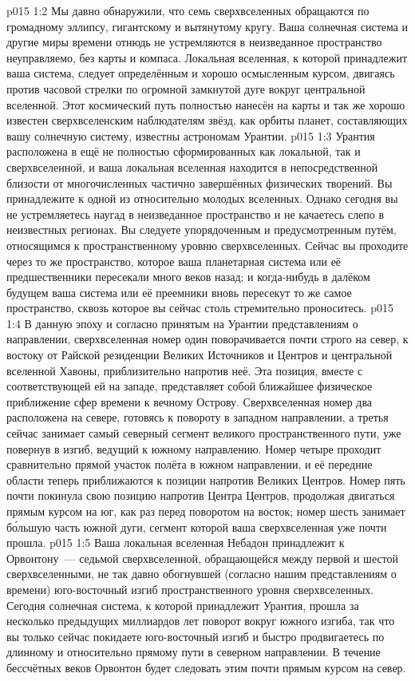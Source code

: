 \vs p015 1:2 Мы давно обнаружили, что семь сверхвселенных обращаются по громадному эллипсу, гигантскому и вытянутому кругу. Ваша солнечная система и другие миры времени отнюдь не устремляются в неизведанное пространство неуправляемо, без карты и компаса. Локальная вселенная, к которой принадлежит ваша система, следует определённым и хорошо осмысленным курсом, двигаясь против часовой стрелки по огромной замкнутой дуге вокруг центральной вселенной. Этот космический путь полностью нанесён на карты и так же хорошо известен сверхвселенским наблюдателям звёзд, как орбиты планет, составляющих вашу солнечную систему, известны астрономам Урантии.
\vs p015 1:3 Урантия расположена в ещё не полностью сформированных как локальной, так и сверхвселенной, и ваша локальная вселенная находится в непосредственной близости от многочисленных частично завершённых физических творений. Вы принадлежите к одной из относительно молодых вселенных. Однако сегодня вы не устремляетесь наугад в неизведанное пространство и не качаетесь слепо в неизвестных регионах. Вы следуете упорядоченным и предусмотренным путём, относящимся к пространственному уровню сверхвселенных. Сейчас вы проходите через то же пространство, которое ваша планетарная система или её предшественники пересекали много веков назад; и когда\hyp{}нибудь в далёком будущем ваша система или её преемники вновь пересекут то же самое пространство, сквозь которое вы сейчас столь стремительно проноситесь.
\vs p015 1:4 \pc В данную эпоху и согласно принятым на Урантии представлениям о направлении, сверхвселенная номер один поворачивается почти строго на север, к востоку от Райской резиденции Великих Источников и Центров и центральной вселенной Хавоны, приблизительно напротив неё. Эта позиция, вместе с соответствующей ей на западе, представляет собой ближайшее физическое приближение сфер времени к вечному Острову. Сверхвселенная номер два расположена на севере, готовясь к повороту в западном направлении, а третья сейчас занимает самый северный сегмент великого пространственного пути, уже повернув в изгиб, ведущий к южному направлению. Номер четыре проходит сравнительно прямой участок полёта в южном направлении, и её передние области теперь приближаются к позиции напротив Великих Центров. Номер пять почти покинула свою позицию напротив Центра Центров, продолжая двигаться прямым курсом на юг, как раз перед поворотом на восток; номер шесть занимает б\'ольшую часть южной дуги, сегмент которой ваша сверхвселенная уже почти прошла.
\vs p015 1:5 Ваша локальная вселенная Небадон принадлежит к Орвонтону~--- седьмой сверхвселенной, обращающейся между первой и шестой сверхвселенными, не так давно обогнувшей (согласно нашим представлениям о времени) юго\hyp{}восточный изгиб пространственного уровня сверхвселенных. Сегодня солнечная система, к которой принадлежит Урантия, прошла за несколько предыдущих миллиардов лет поворот вокруг южного изгиба, так что вы только сейчас покидаете юго\hyp{}восточный изгиб и быстро продвигаетесь по длинному и относительно прямому пути в северном направлении. В течение бессчётных веков Орвонтон будет следовать этим почти прямым курсом на север.
